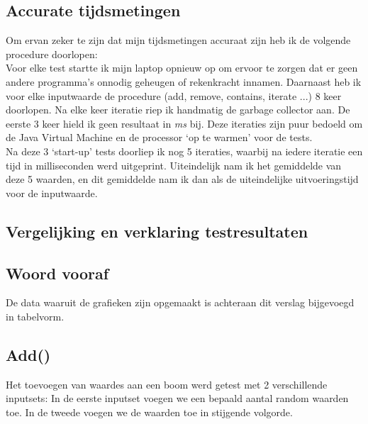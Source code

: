 \documentclass[11pt,a4paper]{report}
\begin{document}
\subsection{Accurate tijdsmetingen}
Om ervan zeker te zijn dat mijn tijdsmetingen accuraat zijn heb ik de volgende procedure doorlopen:\\
Voor elke test startte ik mijn laptop opnieuw op om ervoor te zorgen dat er geen andere programma's onnodig geheugen of  rekenkracht innamen. Daarnaast heb ik voor elke inputwaarde de procedure (add, remove, contains, iterate ...) 8 keer doorlopen. Na elke keer iteratie riep ik handmatig de garbage collector aan. De eerste 3 keer hield ik geen resultaat in \textsl{ms} bij. Deze iteraties zijn puur bedoeld om de Java Virtual Machine en de processor `op te warmen' voor de tests. \\
Na deze 3 `start-up' tests doorliep ik nog 5 iteraties, waarbij na iedere iteratie een tijd in milliseconden werd uitgeprint. Uiteindelijk nam ik het gemiddelde van deze 5 waarden, en dit gemiddelde nam ik dan als de uiteindelijke uitvoeringstijd voor de inputwaarde.

\subsection{Vergelijking en verklaring testresultaten}
\subsection*{Woord vooraf}
De data waaruit de grafieken zijn opgemaakt is achteraan dit verslag bijgevoegd in tabelvorm.
\subsection{Add()}
Het toevoegen van waardes aan een boom werd getest met 2 verschillende inputsets: In de eerste inputset voegen we een bepaald aantal random waarden toe. In de tweede voegen we de waarden toe in stijgende volgorde.
\end{document}
